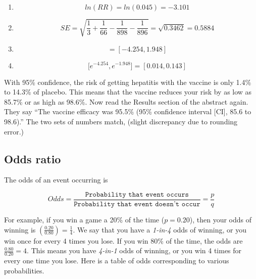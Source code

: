 \documentclass[11pt, chapterprefix=true]{scrbook}\usepackage[]{graphicx}\usepackage[]{color}
\begin{document}
\begin{enumerate}
\item
\begin{equation*}
ln(RR) = ln(0.045) = -3.101
\end{equation*}

\item
\begin{equation*}
SE = \sqrt{ \frac{1}{3} + \frac{1}{66} - \frac{1}{898} - \frac{1}{896}} = \sqrt{0.3462} = 0.5884
\end{equation*}

\item
\begin{equation*}
 [ -3.101 - 1.96(0.5884), -3.101 + 1.96(0.5884) ] = [ -4.254, 1.948]
\end{equation*}

\item
\begin{equation*}
  \Big[ e^{-4.254}, e^{-1.948} \Big] = [ 0.014, 0.143 ]
\end{equation*}

\end{enumerate}

With 95\% confidence, the risk of getting hepatitis with the vaccine is only 1.4\% to 14.3\% of placebo.  This means that the vaccine reduces your risk by as low as 85.7\% or as high as 98.6\%.  Now read the Results section of the abstract again.  They say ``The vaccine efficacy was 95.5\% (95\% confidence interval [CI], 85.6 to 98.6).''  The two sets of numbers match, (slight discrepancy due to rounding error.)

\subsection{Odds ratio}

The odds of an event occurring is

\begin{equation*}
  Odds = \frac{ \texttt{Probability that event occurs}}{\texttt{Probability that event doesn't occur}} = \frac{p}{q}
\end{equation*}

For example, if you win a game a 20\% of the time ($p = 0.20$), then your odds of winning is $( \frac{0.20}{0.80}) = \frac{1}{4}$.  We say that you have a \textit{1-in-4} odds of winning, or you win once for every 4 times you lose.  If you win 80\% of the time, the odds are $\frac{0.80}{0.20} = 4$. This means you have \textit{4-in-1} odds of winning, or you win 4 times for every one time you lose.  Here is a table of odds corresponding to various probabilities.
\end{document}
